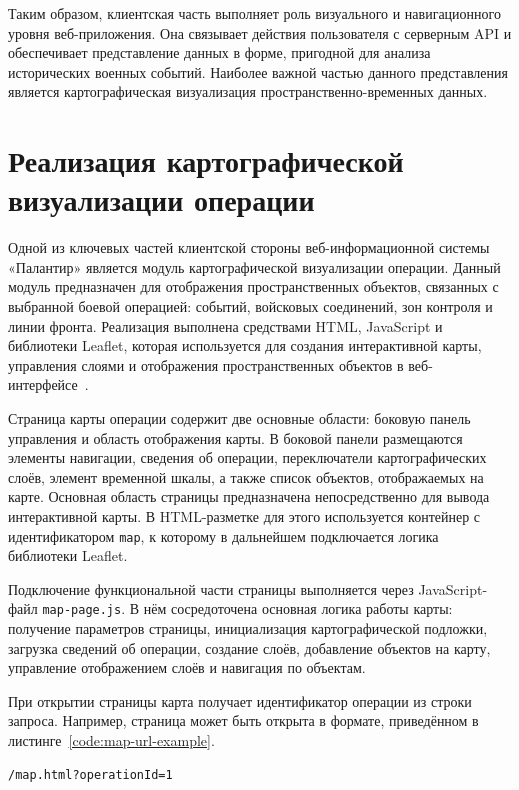 Таким образом, клиентская часть выполняет роль визуального и навигационного уровня веб-приложения. Она связывает действия пользователя с серверным API и обеспечивает представление данных в форме, пригодной для анализа исторических военных событий. Наиболее важной частью данного представления является картографическая визуализация пространственно-временных данных.

\section{Реализация картографической визуализации операции}

Одной из ключевых частей клиентской стороны веб-информационной системы «Палантир» является модуль картографической визуализации операции. Данный модуль предназначен для отображения пространственных объектов, связанных с выбранной боевой операцией: событий, войсковых соединений, зон контроля и линии фронта. Реализация выполнена средствами HTML, JavaScript и библиотеки Leaflet, которая используется для создания интерактивной карты, управления слоями и отображения пространственных объектов в веб-интерфейсе~\cite{leaflet_api_reference}.

Страница карты операции содержит две основные области: боковую панель управления и область отображения карты. В боковой панели размещаются элементы навигации, сведения об операции, переключатели картографических слоёв, элемент временной шкалы, а также список объектов, отображаемых на карте. Основная область страницы предназначена непосредственно для вывода интерактивной карты. В HTML-разметке для этого используется контейнер с идентификатором \texttt{map}, к которому в дальнейшем подключается логика библиотеки Leaflet.

Подключение функциональной части страницы выполняется через JavaScript-файл \texttt{map-page.js}. В нём сосредоточена основная логика работы карты: получение параметров страницы, инициализация картографической подложки, загрузка сведений об операции, создание слоёв, добавление объектов на карту, управление отображением слоёв и навигация по объектам.

При открытии страницы карта получает идентификатор операции из строки запроса. Например, страница может быть открыта в формате, приведённом в листинге~\ref{code:map-url-example}.

\begin{code}
\label{code:map-url-example}
\vspace{-0.75cm}
\begin{verbatim}
/map.html?operationId=1
\end{verbatim}
\end{code}

